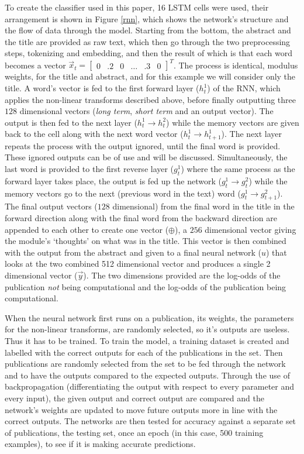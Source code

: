 \documentclass[12pt, a4paper]{article}
\begin{document}
To create the classifier used in this paper, 16 LSTM cells were used, their arrangement is shown in Figure \ref{rnn}, which shows the network's structure and the flow of data through the model. Starting from the bottom, the abstract and the title are provided as raw text, which then go through the two preprocessing steps, tokenizing and embedding, and then the result of which is that each word becomes a vector $\vec{x}_t = \begin{bmatrix}0&.2&0&\dots&.3&0\end{bmatrix}^T$. The process is identical, modulus weights, for the title and abstract, and for this example we will consider only the title. A word's vector is fed to the first forward layer ($h_t^1$) of the RNN, which applies the non-linear transforms described above, before finally outputting three $128$ dimensional vectors (\textit{long term}, \textit{short term} and an output vector). The output is then fed to the next layer ($h_t^1 \rightarrow h^2_t$) while the memory vectors are given back to the cell along with the next word vector ($h_t^1 \rightarrow h^1_{t+1}$). The next layer repeats the process with the output ignored, until the final word is provided. These ignored outputs can be of use and will be discussed. Simultaneously, the last word is provided to the first reverse layer  ($g^1_t$) where the same process as the forward layer takes place, the output is fed up the network ($g_t^1 \rightarrow g^2_t$) while the memory vectors go to the next (previous word in the text) word  ($g_t^1 \rightarrow g^2_{t+1}$). The final output vectors ($128$ dimensional) from the final word in the title in the forward direction along with the final word from the backward direction are appended to each other to create one vector ($\oplus$), a $256$ dimensional vector giving the module's `thoughts' on what was in the title. This vector is then combined with the output from the abstract and given to a final neural network ($u$) that looks at the two combined 512 dimensional vector and produces a single 2 dimensional vector ($\vec{y}$). The two dimensions provided are the log-odds of the publication \textit{not} being computational and the log-odds of the publication being computational.

When the neural network first runs on a publication, its weights, the parameters for the non-linear transforms, are randomly selected, so it's outputs are useless. Thus it has to be trained. To train the model, a training dataset is created and labelled with the correct outputs for each of the publications in the set. Then publications are randomly selected from the set to be fed through the network and to have the outputs compared to the expected outputs. Through the use of backpropagation \citep{werbos1982applications} (differentiating the output with respect to every parameter and every input), the given output and correct output are compared and the network's weights are updated to move future outputs more in line with the correct outputs. The networks are then tested for accuracy against a separate set of publications, the testing set, once an epoch (in this case, 500 training examples), to see if it is making accurate predictions.
\end{document}
